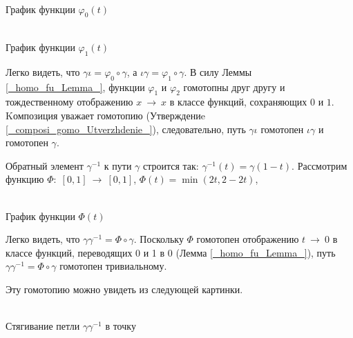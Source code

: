 \documentclass[12pt]{book}
\newcommand{\arrow}{{\:\longrightarrow\:}}
\renewcommand{\phi}{\varphi}
\theoremstyle{upshape}
\theoremstyle{generic}
\theoremstyle{upshapenonumber}
\newcommand{\следствие}{%
     \refstepcounter{teorema}
     {\noindent\bf Следствие \thechapter.\arabic{teorema}:\ }}
\newcommand{\пример}{%
     \refstepcounter{teorema}
     {\noindent\bf Пример \thechapter.\arabic{teorema}:\ }}
\newcommand{\лемма}{%
     \refstepcounter{teorema}
     {\noindent\bf Лемма \thechapter.\arabic{teorema}:\ }}
\newcommand{\теорема}{%
     \refstepcounter{teorema}
     {\noindent\bf Теорема \thechapter.\arabic{teorema}:\ }}
\newcommand{\утверждение}{%
     \refstepcounter{teorema}
     {\noindent\bf Утверждение \thechapter.\arabic{teorema}:\ }}
\begin{document}
\begin{center}
\begin{minipage}{.45\linewidth}
\begin{center}\\ 
{\small График функции $\phi_0(t)$} \end{center}\end{minipage}
\begin{minipage}{.45\linewidth}
\begin{center}\\ 
{\small График функции $\phi_1(t)$} \end{center}\end{minipage}
\end{center}


Легко видеть, что $\gamma\iota= \phi_0 \circ\gamma$, а
$\iota\gamma= \phi_1 \circ\gamma$. В силу Леммы \ref{_homo_fu_Lemma_},
функции $\phi_1$ и $\phi_2$ гомотопны друг другу и тождественному
отображению $x\arrow x$ в классе функций, сохраняющих
$0$ и $1$. Kомпозиция уважает гомотопию
(Утверждениe \ref{_composi_gomo_Utverzhdenie_}), следовательно,
путь $\gamma\iota$ гомотопен $\iota\gamma$ и гомотопен
$\gamma$.

Обратный элемент $\gamma^{-1}$ к пути $\gamma$
строится так: $\gamma^{-1}(t) = \gamma(1-t)$.
Рассмотрим функцию $\Phi:\; [0,1]\arrow [0,1]$,
$\Phi(t)= \min(2t, 2-2t)$,



\begin{center}\\ 
{\small График функции $\Phi(t)$} \end{center}


Легко видеть, что $\gamma\gamma^{-1}=\Phi\circ\gamma$.
Поскольку $\Phi$ гомотопен отображению $t\arrow 0$
в классе функций, переводящих 0 и 1 в 0 (Лемма \ref{_homo_fu_Lemma_}), 
путь $\gamma\gamma^{-1}=\Phi\circ\gamma$ гомотопен тривиальному.

Эту гомотопию можно увидеть  из следующей картинки.

\begin{center}\\ 
{\small Стягивание петли $\gamma\gamma^{-1}$ в точку} \end{center}
\end{document}
